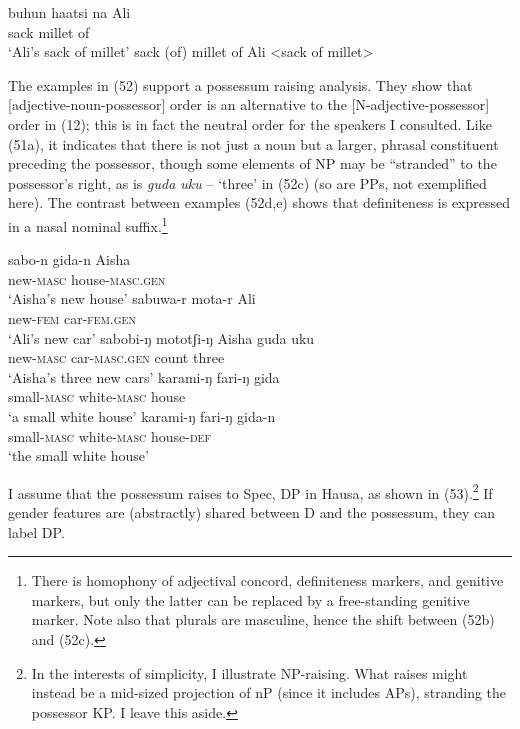 \documentclass[output=paper
,modfonts
,nonflat]{langsci/langscibook}
\begin{document}
\begin{exe}
	\ex 
	\xlist
	\ex 
	\gll buhun haatsi na Ali\\
	sack     millet  of\\
	\glt `Ali's sack of millet'  	
	\ex {\lbrack}sack (of) millet{\rbrack} of Ali <sack of millet>
	
	\endxlist
\end{exe}
The examples in (52) support a possessum raising analysis. They show that [adjective-noun-possessor] order is an alternative to the [N-adjective-possessor] order in (12); this is in fact the neutral order for the speakers I consulted. Like (51a), it indicates that there is not just a noun but a larger, phrasal constituent preceding the possessor, though some elements of NP may be “stranded” to the possessor’s right, as is \textit{guda uku} – ‘three’ in (52c) (so are PPs, not exemplified here). The contrast between examples (52d,e) shows that definiteness is expressed in a nasal nominal suffix.\footnote{There is homophony of adjectival concord, definiteness markers, and genitive markers, but only the latter can be replaced by a free-standing genitive marker. Note also that plurals are masculine, hence the shift between (52b) and (52c).}
\begin{exe}
	\ex 
	\xlist
	\ex 
	\gll sabo-n        gida-n           Aisha\\
	new-\textsc{masc}  house-\textsc{masc.gen}\\
	\glt `Aisha's new house'  	
	\ex 
	\gll sabuwa-r     mota-r       Ali\\
	new-\textsc{fem}     car-\textsc{fem.gen}\\
	\glt `Ali's new car'
	\ex 
	\gll sabobi-ŋ     mototʃi-ŋ       Aisha   guda     uku\\
	new-\textsc{masc}  car-\textsc{masc.gen}    {}        count     three\\
	\glt `Aisha's three new cars'  	
	\ex 
	\gll karami-ŋ   fari-ŋ       gida\\
	small-\textsc{masc}  white-\textsc{masc}   house\\
	\glt `a small white house'	
	\ex 
	\gll karami-ŋ     fari-ŋ         gida-n\\
	small-\textsc{masc}     white-\textsc{masc}  house-\textsc{def}\\
	\glt `the small white house'	
	\endxlist
\end{exe}
I assume that the possessum raises to Spec, DP in Hausa, as shown in (53).\footnote{In the interests of simplicity, I illustrate NP-raising. What raises might instead be a mid-sized projection of nP (since it includes APs), stranding the possessor KP. I leave this aside.} If gender features are (abstractly) shared between D and the possessum, they can label DP. 
\end{document}

